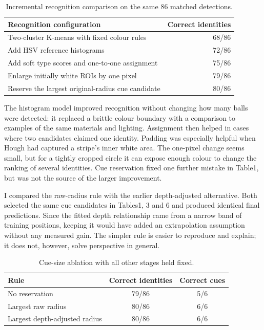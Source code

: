 \documentclass[12pt,a4paper]{article}
\begin{document}
\begin{table}[H]\centering\small
\caption{Incremental recognition comparison on the same 86 matched detections.}\label{tab:abl}
\begin{tabularx}{\linewidth}{@{}Xr@{}}\toprule
Recognition configuration & Correct identities\\\midrule
Two-cluster K-means with fixed colour rules & 68/86\\
Add HSV reference histograms & 72/86\\
Add soft type scores and one-to-one assignment & 75/86\\
Enlarge initially white ROIs by one pixel & 79/86\\
Reserve the largest original-radius cue candidate & 80/86\\\bottomrule\end{tabularx}
\end{table}

The histogram model improved recognition without changing how many balls were detected: it replaced a brittle colour boundary with a comparison to examples of the same materials and lighting. Assignment then helped in cases where two candidates claimed one identity. Padding was especially helpful when Hough had captured a stripe's inner white area. The one-pixel change seems small, but for a tightly cropped circle it can expose enough colour to change the ranking of several identities. Cue reservation fixed one further mistake in Table1, but was not the source of the larger improvement.

I compared the raw-radius rule with the earlier depth-adjusted alternative. Both selected the same cue candidates in Tables1, 3 and 6 and produced identical final predictions. Since the fitted depth relationship came from a narrow band of training positions, keeping it would have added an extrapolation assumption without any measured gain. The simpler rule is easier to reproduce and explain; it does not, however, solve perspective in general.

\begin{table}[H]\centering\small
\caption{Cue-size ablation with all other stages held fixed.}\label{tab:cue}
\begin{tabular}{lcc}\toprule Rule & Correct identities & Correct cues\\\midrule No reservation & 79/86 & 5/6\\ Largest raw radius & 80/86 & 6/6\\ Largest depth-adjusted radius & 80/86 & 6/6\\\bottomrule\end{tabular}
\end{table}
\end{document}
